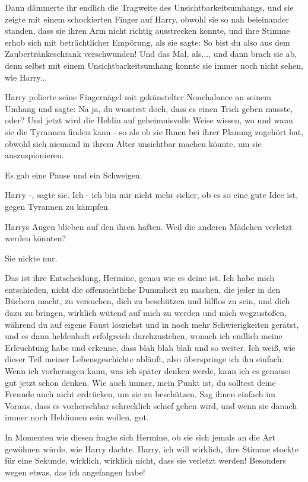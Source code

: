 Dann dämmerte ihr endlich die Tragweite des Unsichtbarkeitsumhangs, und sie
zeigte mit einem schockierten Finger auf Harry, obwohl sie so nah beieinander
standen, dass sie ihren Arm nicht richtig ausstrecken konnte, und ihre Stimme
erhob sich mit beträchtlicher Empörung, als sie sagte: \glqq So bist du also aus
dem Zaubertränkeschrank verschwunden! Und das Mal, als...\grqq{}, und dann brach
sie ab, denn selbst mit einem Unsichtbarkeitsumhang konnte sie immer noch nicht
sehen, wie Harry...

Harry polierte seine Fingernägel mit gekünstelter Nonchalance an seinem Umhang
und sagte: \glqq Na ja, du wusstest doch, dass es einen Trick geben musste,
oder? Und jetzt wird die Heldin auf geheimnisvolle Weise wissen, wo und wann sie
die Tyrannen finden kann - so als ob sie Ihnen bei ihrer Planung zugehört hat,
obwohl sich niemand in ihrem Alter unsichtbar machen könnte, um sie
auszuspionieren.\grqq{}

Es gab eine Pause und ein Schweigen.

\glqq Harry -\grqq{}, sagte sie. \glqq Ich - ich bin mir nicht mehr sicher, ob
es so eine gute Idee ist, gegen Tyrannen zu kämpfen.\grqq{}

Harrys Augen blieben auf den ihren haften. \glqq Weil die anderen Mädchen
verletzt werden könnten?\grqq{}

Sie nickte nur.

\glqq Das ist ihre Entscheidung, Hermine, genau wie es deine ist. Ich habe mich
entschieden, nicht die offensichtliche Dummheit zu machen, die jeder in den
Büchern macht, zu versuchen, dich zu beschützen und hilflos zu sein, und dich
dazu zu bringen, wirklich wütend auf mich zu werden und mich wegzustoßen,
während du auf eigene Faust losziehst und in noch mehr Schwierigkeiten gerätst,
und es dann heldenhaft erfolgreich durchzustehen, wonach ich endlich meine
Erleuchtung habe und erkenne, dass blah blah blah und so weiter. Ich weiß, wie
dieser Teil meiner Lebensgeschichte abläuft, also überspringe ich ihn einfach.
Wenn ich vorhersagen kann, was ich später denken werde, kann ich es genauso gut
jetzt schon denken. Wie auch immer, mein Punkt ist, du solltest deine Freunde
auch nicht erdrücken, um sie zu beschützen. Sag ihnen einfach im Voraus, dass es
vorhersehbar schrecklich schief gehen wird, und wenn sie danach immer noch
Heldinnen sein wollen, gut.\grqq{}

In Momenten wie diesen fragte sich Hermine, ob sie sich jemals an die Art
gewöhnen würde, wie Harry dachte. \glqq Harry, ich will wirklich\grqq{}, ihre
Stimme stockte für eine Sekunde, \glqq wirklich, wirklich nicht, dass sie
verletzt werden! Besonders wegen etwas, das ich angefangen habe!\grqq{}

